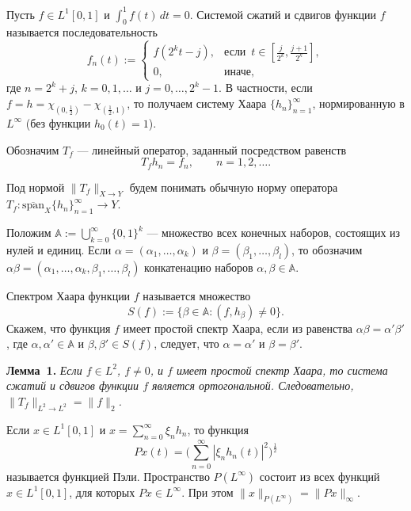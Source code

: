 



Пусть $f\in L^1[0,1]$ и $\int_0^1f(t)\,dt=0$. Системой сжатий и сдвигов функции $f$ называется последовательность
$$
f_n(t):=\begin{cases}
f(2^kt-j), & \text{если}\,\,\, t\in[\frac{j}{2^k},\frac{j+1}{2^k}], \\
0, & \text{иначе},
\end{cases}
$$
где $n=2^k+j$, $k=0,1,\ldots$ и $j=0,\ldots,2^k-1$. В частности, если $f=h=\chi_{(0,\frac12)}-\chi_{(\frac12,1)}$, то получаем
систему Хаара $\{h_n\}_{n=1}^{\infty}$, нормированную в $L^{\infty}$ (без функции $h_0(t)=1$).

Обозначим $T_f$ --- линейный оператор, заданный посредством равенств
$$
T_fh_n=f_n, \qquad n=1,2,\ldots.
$$

Под нормой $\|T_f\|_{X\to Y}$ будем понимать обычную норму оператора $T_f:\overline{\text{span}}_X\{h_n\}_{n=1}^{\infty}\to Y$.

Положим $\mathbb{A}:=\bigcup_{k=0}^{\infty}\{0,1\}^k$ --- множество всех конечных наборов, состоящих из нулей и единиц.
Если $\alpha=(\alpha_1,\ldots,\alpha_k)$ и $\beta=(\beta_1,\ldots,\beta_l)$, то обозначим
$\alpha\beta=(\alpha_1,\ldots,\alpha_k,\beta_1,\ldots,\beta_l)$ конкатенацию наборов $\alpha,\beta\in\mathbb{A}$.

Спектром Хаара функции $f$ называется множество
$$
S(f):=\{\beta\in\mathbb{A}:(f,h_{\beta})\neq0\}.
$$
Скажем, что функция $f$ имеет простой спектр Хаара, если из равенства $\alpha\beta=\alpha'\beta'$, где $\alpha,\alpha'\in\mathbb{A}$ и $\beta,\beta'\in S(f)$, следует, что $\alpha=\alpha'$ и $\beta=\beta'$.

\textbf{Лемма~1.} {\it Если $f\in L^2$, $f\neq0$, и $f$ имеет простой спектр Хаара, то система сжатий и сдвигов функции $f$ является ортогональной.
Следовательно, $\|T_f\|_{L^2\to L^2}=\|f\|_2$.}

Если $x\in L^1[0,1]$ и $x=\sum_{n=0}^{\infty}\xi_nh_n$, то функция
$$
Px(t)=\biggl(\sum_{n=0}^{\infty}|\xi_nh_n(t)|^2\biggr)^{\frac12}
$$
называется функцией Пэли. Пространство $P(L^{\infty})$ состоит из всех функций $x\in L^1[0,1]$, для которых $Px\in L^{\infty}$.
При этом $\|x\|_{P(L^{\infty})}=\|Px\|_{\infty}$.

